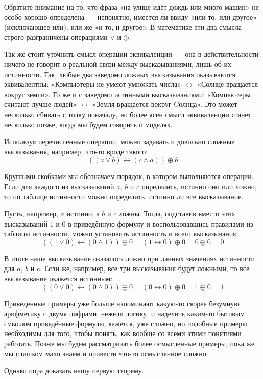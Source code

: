 Обратите внимание на то, что фраза «на улице идёт дождь или много машин» не особо хорошо определена~--- непонятно, имеется ли ввиду «или то, или другое» (исключающее или), или же «и то, и другое». В математике эти два смысла строго разграничены операциями $\vee$ и $\oplus$.

Так же стоит уточнить смысл операции эквиваленции~--- она в действительности ничего не говорит о реальной связи между высказываниями, лишь об их истинности. Так, любые два заведомо ложных высказывания оказываются эквивалентны: «Компьютеры не умеют умножать числа» $\leftrightarrow$ «Солнце вращается вокруг земли». То же и с заведомо истинными высказываниями: «Компьютеры считают лучше людей» $\leftrightarrow$ «Земля вращается вокруг Cолнца». Это может несколько сбивать с толку поначалу, но более ясен смысл эквиваленции станет несколько позже, когда мы будем говорить о моделях.

Используя перечисленные операции, можно задавать и довольно сложные высказывания, например, что-то вроде такого:
$$
((a \vee b) \leftrightarrow (c \wedge a)) \oplus b
$$

Круглыми скобками мы обозначаем порядок, в котором выполняются операции. Если для каждого из высказываний $a$, $b$ и $c$ определить, истинно оно или ложно, то по таблице истинности можно определить, истинно ли все высказывание.

Пусть, например, $a$ истинно, а $b$ и $c$ ложны. Тогда, подставив вместо этих высказываний $1$ и $0$ в приведённую формулу и воспользовавшись правилами из таблицы истинности, можно установить истинность и всего высказывания:
$$
((1 \vee 0) \leftrightarrow (0 \wedge 1)) \oplus 0 = (1 \leftrightarrow 0) \oplus 0 = 0 \oplus 0 = 0
$$

В итоге наше высказывание оказалось ложно при данных значениях истинности для $a$, $b$ и $c$. Если же, например, все три высказывания будут ложными, то все высказывание окажется истинным:
$$
((0 \vee 0) \leftrightarrow (0 \wedge 0)) \oplus 0 = (0 \leftrightarrow 0) \oplus 0 = 1 \oplus 0 = 1
$$

Приведенные примеры уже больше напоминают какую-то скорее безумную арифметику с двумя цифрами, нежели логику, и наделить каким-то бытовым смыслом приведённые формулы, кажется, уже сложно, но подобные примеры необходимы для того, чтобы понять, как вообще со всеми этими понятиями работать. Позже мы будем рассматривать более осмысленные примеры, пока же мы слишком мало знаем и привести что-то осмысленное сложно.

Однако пора доказать нашу первую теорему.

